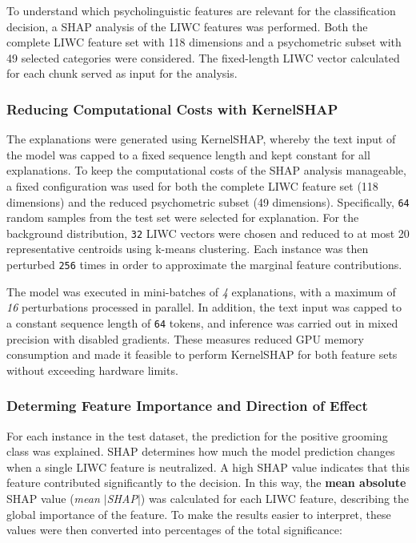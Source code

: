 To understand which psycholinguistic features are relevant for the classification decision, a SHAP analysis of the LIWC features was performed. Both the complete LIWC feature set with 118 dimensions and a psychometric subset with 49 selected categories were considered. The fixed-length LIWC vector calculated for each chunk served as input for the analysis. 

\subsubsection{Reducing Computational Costs with KernelSHAP}
The explanations were generated using KernelSHAP, whereby the text input of the model was capped to a fixed sequence length and kept constant for all explanations. To keep the computational costs of the SHAP analysis manageable, a fixed configuration was used for both the complete LIWC feature set (118 dimensions) and the reduced psychometric subset (49 dimensions). Specifically, \texttt{64} random samples from the test set were selected for explanation. For the background distribution, \texttt{32} LIWC vectors were chosen and reduced to at most 20 representative centroids using k-means clustering. Each instance was then perturbed \texttt{256} times in order to approximate the marginal feature contributions. 

The model was executed in mini-batches of \textit{4} explanations, with a maximum of \textit{16} perturbations processed in parallel. In addition, the text input was capped to a constant sequence length of \texttt{64} tokens, and inference was carried out in mixed precision with disabled gradients. These measures reduced GPU memory consumption and made it feasible to perform KernelSHAP for both feature sets without exceeding hardware limits.

\subsubsection{Determing Feature Importance and Direction of Effect}

For each instance in the test dataset, the prediction for the positive grooming class was explained. SHAP determines how much the model prediction changes when a single LIWC feature is neutralized. A high SHAP value indicates that this feature contributed significantly to the decision. In this way, the \textbf{mean absolute} SHAP value (\emph{mean $|$SHAP$|$}) was calculated for each LIWC feature, describing the global importance of the feature. To make the results easier to interpret, these values were then converted into percentages of the total significance:

